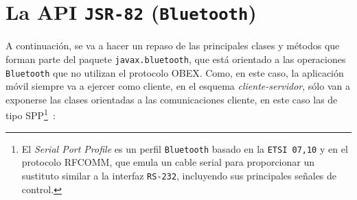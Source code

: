 \chapter{La \acs{API} \texttt{\acs{JSR}-82} (\texttt{Bluetooth})}
\label{chap:jsr82}

A continuación, se va a hacer un repaso de las principales clases y métodos
que forman parte del paquete \texttt{javax.bluetooth}, que está orientado a 
las operaciones \texttt{Bluetooth} que no utilizan el protocolo \acs{OBEX}.
Como, en este caso, la aplicación móvil siempre va a ejercer como 
cliente, en el esquema \emph{cliente-servidor}, sólo van a exponerse las
clases orientadas a las comunicaciones cliente, en este caso las de tipo
\acs{SPP}\footnote{El \emph{Serial Port Profile} es un perfil \texttt{Bluetooth} 
basado en la \texttt{\acs{ETSI} 07,10} y en el protocolo \acs{RFCOMM}, que
emula un cable serial para proporcionar un sustituto similar a la interfaz
\texttt{RS-232}, incluyendo sus principales señales de
control.}~\cite{bib:jsr82}:

